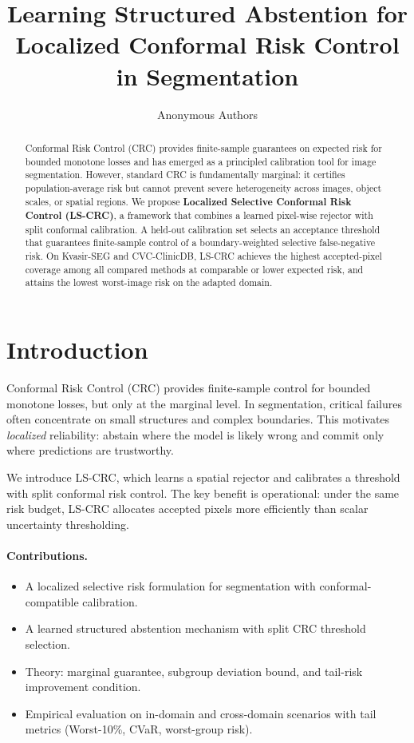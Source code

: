 \documentclass{article}
\title{Learning Structured Abstention for Localized Conformal Risk Control in Segmentation}
\author{Anonymous Authors}
\date{}
\begin{document}
\maketitle

\begin{abstract}
Conformal Risk Control (CRC) provides finite-sample guarantees on expected risk for bounded monotone losses and has emerged as a principled calibration tool for image segmentation. However, standard CRC is fundamentally marginal: it certifies population-average risk but cannot prevent severe heterogeneity across images, object scales, or spatial regions. We propose \textbf{Localized Selective Conformal Risk Control (LS-CRC)}, a framework that combines a learned pixel-wise rejector with split conformal calibration. A held-out calibration set selects an acceptance threshold that guarantees finite-sample control of a boundary-weighted selective false-negative risk. On Kvasir-SEG and CVC-ClinicDB, LS-CRC achieves the highest accepted-pixel coverage among all compared methods at comparable or lower expected risk, and attains the lowest worst-image risk on the adapted domain.
\end{abstract}

\section{Introduction}
Conformal Risk Control (CRC) provides finite-sample control for bounded monotone losses, but only at the marginal level. In segmentation, critical failures often concentrate on small structures and complex boundaries. This motivates \emph{localized} reliability: abstain where the model is likely wrong and commit only where predictions are trustworthy.

We introduce LS-CRC, which learns a spatial rejector and calibrates a threshold with split conformal risk control. The key benefit is operational: under the same risk budget, LS-CRC allocates accepted pixels more efficiently than scalar uncertainty thresholding.

\paragraph{Contributions.}
\begin{itemize}
  \item A localized selective risk formulation for segmentation with conformal-compatible calibration.
  \item A learned structured abstention mechanism with split CRC threshold selection.
  \item Theory: marginal guarantee, subgroup deviation bound, and tail-risk improvement condition.
  \item Empirical evaluation on in-domain and cross-domain scenarios with tail metrics (Worst-10\%, CVaR, worst-group risk).
\end{itemize}
\end{document}
